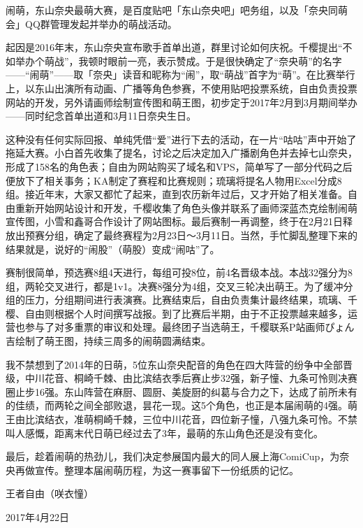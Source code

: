 %
%


闹萌，东山奈央最萌大赛，是百度贴吧「东山奈央吧」吧务组，以及「奈央同萌会」QQ群管理发起并举办的萌战活动。

起因是2016年末，东山奈央宣布歌手首单出道，群里讨论如何庆祝。千樱提出“不如举办个萌战”，我顿时眼前一亮，表示赞成。于是很快确定了“奈央萌”的名字——“闹萌”——取{\mincho 「奈央」}读音和昵称为“闹”，取“萌战”首字为“萌”。在比赛举行上，以东山出演所有动画、广播等角色参赛，不使用贴吧投票系统，自由负责投票网站的开发，另外请画师绘制宣传图和萌王图，初步定于2017年2月到3月期间举办——同时纪念首单出道和3月11日奈央生日。

这种没有任何实际回报、单纯凭借“爱”进行下去的活动，在一片“咕咕”声中开始了拖延大赛。小白首先收集了提名，讨论之后决定加入广播剧角色并去掉七山奈央，形成了158名的角色表；自由为网站购买了域名和VPS，简单写了一部分代码之后便放下了相关事务；KA制定了赛程和比赛规则；琉璃将提名人物用Excel分成8组。接近年末，大家又都忙了起来，直到农历新年过后，又才开始了相关准备。自由重新开始网站设计和开发，千樱收集了角色头像并联系了画师深蓝杰克绘制闹萌宣传图，小雪和鑫哥合作设计了网站图标。最后赛制一再调整，终于在2月21日释放出预赛分组，确定了最终赛程为2月23日〜3月11日。当然，手忙脚乱整理下来的结果就是，说好的“闹股”（萌股）变成“闹咕”了。

赛制很简单，预选赛8组4天进行，每组可投8位，前4名晋级本战。本战32强分为8组，两轮交叉进行，都是1v1。决赛8强分为4组，交叉三轮决出萌王。为了缓冲分组的压力，分组期间进行表演赛。比赛结束后，自由负责集计最终结果，琉璃、千樱、自由则根据个人时间撰写战报。到了比赛后半期，由于不正投票越来越多，运营也参与了对多重票的审议和处理。最终团子当选萌王，千樱联系P站画师{\mincho ぴょん吉}绘制了萌王图，持续三周多的闹萌圆满结束。

我不禁想到了2014年的日萌，5位东山奈央配音的角色在四大阵营的纷争中全部晋级，中川花音、桐崎千棘、由比滨结衣季后赛止步32强，新子憧、九条可怜则决赛圈止步16强。东山阵营在麻厨、圆厨、美旋厨的纠葛与合力之下，达成了前所未有的佳绩，而两轮之间全部败退，昙花一现。这5个角色，也正是本届闹萌的4强。萌王由比滨结衣，准萌桐崎千棘，三位中川花音，四位新子憧，八强九条可怜。不禁叫人感慨，距离末代日萌已经过去了3年，最萌的东山角色还是没有变化。


最后，趁着闹萌的热劲儿，我们决定参展国内最大的同人展上海ComiCup，为奈央再做宣传。整理本届闹萌历程，为这一赛事留下一份纸质的记忆。

\begin{flushright}
  \kasho 王者自由（咲衣憧）

  \kai 2017年4月22日
\end{flushright}
